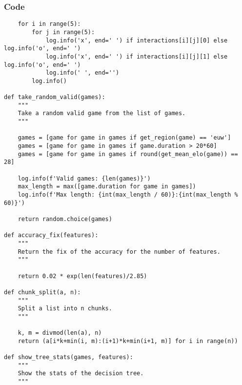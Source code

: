 \documentclass{beamer}
\begin{document}
\begin{frame}[fragile]
    \frametitle{Code}
    \fontsize{3pt}{5pt}\selectfont
    \begin{verbatim}
    for i in range(5):
        for j in range(5):
            log.info('x', end=' ') if interactions[i][j][0] else log.info('o', end=' ')
            log.info('x', end=' ') if interactions[i][j][1] else log.info('o', end=' ')
            log.info(' ', end='')
        log.info()

def take_random_valid(games):
    """
    Take a random valid game from the list of games.
    """

    games = [game for game in games if get_region(game) == 'euw']
    games = [game for game in games if game.duration > 20*60]
    games = [game for game in games if round(get_mean_elo(game)) == 28]

    log.info(f'Valid games: {len(games)}')
    max_length = max([game.duration for game in games])
    log.info(f'Max length: {int(max_length / 60)}:{int(max_length % 60)}')
    
    return random.choice(games)

def accuracy_fix(features):
    """
    Return the fix of the accuracy for the number of features.
    """
    
    return 0.02 * exp(len(features)/2.85)

def chunk_split(a, n):
    """
    Split a list into n chunks.
    """
    
    k, m = divmod(len(a), n)
    return (a[i*k+min(i, m):(i+1)*k+min(i+1, m)] for i in range(n))

def show_tree_stats(games, features):
    """
    Show the stats of the decision tree.
    """
    \end{verbatim}
\end{frame}
\end{document}
